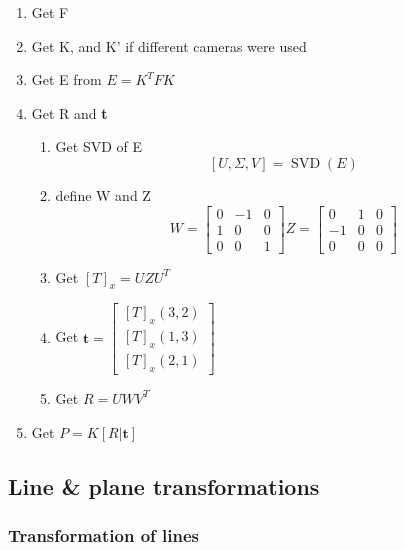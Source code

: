 \begin{enumerate}
    \item Get F
    \item Get K, and K' if different cameras were used
    \item Get E from \(E = K^T F K\)
    \item Get R and \textbf{t}
        \begin{enumerate}
            \item Get SVD of E \[ [U, \Sigma, V] = \operatorname{SVD}(E) \]
            \item define W and Z
                \[
                    W = \begin{bmatrix}
                        0   &   -1  & 0 \\
                        1   &   0   & 0 \\
                        0   &   0   & 1
                    \end{bmatrix}
                    Z = \begin{bmatrix}
                        0   &   1   & 0 \\
                        -1  &   0   & 0 \\
                        0   &   0   & 0
                    \end{bmatrix}
                \]
            \item Get \( {[T]}_x = U Z U^T\)
            \item Get \(\boldsymbol{t} = \begin{bmatrix}
                        {[T]}_x(3,2) \\
                        {[T]}_x(1,3) \\
                        {[T]}_x(2,1)
                \end{bmatrix}\)
            \item Get \(R = U W V^T\)
        \end{enumerate}
    \item Get \( P = K [R | \boldsymbol{t}] \)
\end{enumerate}



\subsection{Line \& plane transformations}

\subsubsection{Transformation of lines}

